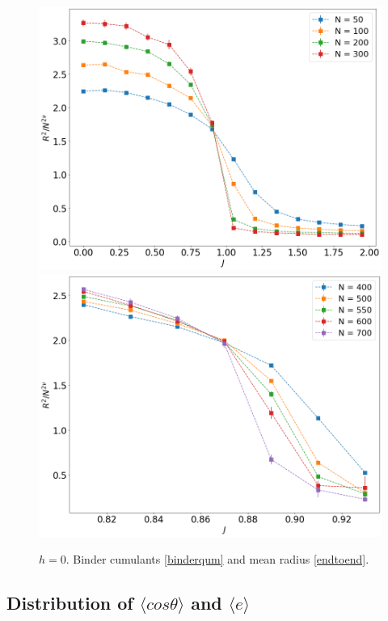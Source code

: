 \begin{figure}[H]
	\includegraphics[scale=0.23]{Images/3_rscaling_shortchains.png}
	\includegraphics[scale=0.23]{Images/3_rscaling_longchains.png} 	
	
	\caption{$h=0$. Binder  cumulants \eqref{binderqum} and mean radius \eqref{endtoend}.  }
	\label{fig:bcshort_3D}
\end{figure}



\subsection{Distribution of $\langle cos \theta \rangle$ and $\langle e \rangle$ } \label{sec:distributions_3D}



